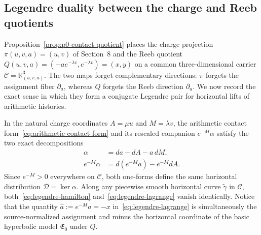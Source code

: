 
\subsection{Legendre duality between the charge and Reeb quotients}
\label{subsec:legendre-duality}

Proposition~\ref{prop:p0-contact-quotient} places the charge projection
$\pi(u,v,a)=(u,v)$ of Section~8 and the Reeb quotient
$Q(u,v,a)=(-ae^{-\lambda v}, e^{-\lambda v})=(x,y)$ on a common three-dimensional
carrier $\mathcal{C}=\mathbb{R}^3_{(u,v,a)}$. The two maps forget complementary
directions: $\pi$ forgets the assignment fiber $\partial_a$, whereas $Q$ forgets
the Reeb direction $\partial_u$. We now record the exact sense in which they form
a conjugate Legendre pair for horizontal lifts of arithmetic histories.

In the natural charge coordinates $A=\mu u$ and $M=\lambda v$, the arithmetic
contact form~\eqref{eq:arithmetic-contact-form} and its rescaled companion $e^{-M}\alpha$
satisfy the two exact decompositions
\begin{align}
  \alpha &= da - dA - a\,dM, \label{eq:legendre-hamilton} \\
  e^{-M}\alpha &= d\!\left(e^{-M}a\right) - e^{-M}dA. \label{eq:legendre-lagrange}
\end{align}
Since $e^{-M}>0$ everywhere on $\mathcal{C}$, both one-forms define the same
horizontal distribution $\mathcal{D}=\ker\alpha$. Along any piecewise smooth
horizontal curve $\tilde{\gamma}$ in $\mathcal{C}$, both~\eqref{eq:legendre-hamilton}
and~\eqref{eq:legendre-lagrange} vanish identically. Notice that the quantity
$\hat{a}:=e^{-M}a=-x$ in~\eqref{eq:legendre-lagrange} is simultaneously the
source-normalized assignment and minus the horizontal coordinate of the basic
hyperbolic model $\mathfrak{E}_0$ under $Q$.

